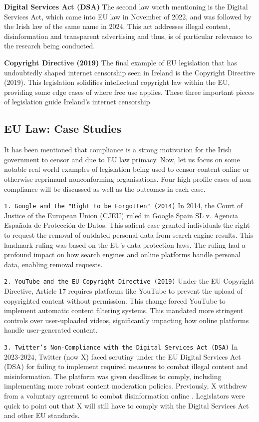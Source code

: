\textbf{Digital Services Act (DSA)}
The second law worth mentioning is the Digital Services Act, which came into EU law in November of 2022, and was followed by the Irish law of the same name in 2024. \cite{enterprisegovie2025} \cite{irishstatutebook2024} This act addresses illegal content, disinformation and transparent advertising and thus, is of particular relevance to the research being conducted. 

\textbf{Copyright Directive (2019)}
The final example of EU legislation that has undoubtedly shaped internet censorship seen in Ireland is the Copyright Directive (2019). This legislation solidifies intellectual copyright law within the EU, providing some edge cases of where free use applies. \cite{EUCopyright} These three important pieces of legislation guide Ireland's internet censorship. 

\subsection{EU Law: Case Studies}
It has been mentioned that compliance is a strong motivation for the Irish government to censor and due to EU law primacy. Now, let us focus on some notable real world examples of legislation being used to censor content online or otherwise reprimand nonconforming organisations. Four high profile cases of non compliance will be discussed as well as the outcomes in each case. 

\texttt{1. Google and the "Right to be Forgotten" (2014)}
In 2014, the Court of Justice of the European Union (CJEU) ruled in Google Spain SL v. Agencia Española de Protección de Datos. This salient case granted individuals the right to request the removal of outdated personal data from search engine results. \cite{google2014} This landmark ruling was based on the EU's data protection laws. The ruling had a profound impact on how search engines and online platforms handle personal data, enabling removal requests.

\texttt{2. YouTube and the EU Copyright Directive (2019)}
Under the EU Copyright Directive, Article 17 requires platforms like YouTube to prevent the upload of copyrighted content without permission. \cite{eu2019} This change forced YouTube to implement automatic content filtering systems. This mandated more stringent controls over user-uploaded videos, significantly impacting how online platforms handle user-generated content. 


\texttt{3. Twitter's Non-Compliance with the Digital Services Act (DSA)}
In 2023-2024, Twitter (now X) faced scrutiny under the EU Digital Services Act (DSA) for failing to implement required measures to combat illegal content and misinformation. \cite{twitter2023} The platform was given deadlines to comply, including implementing more robust content moderation policies. Previously, X withdrew from a voluntary agreement to combat disinformation online \cite{bhr2023}. Legislators were quick to point out that X will still have to comply with the Digital Services Act and other EU standards. \cite{bhr2023}



